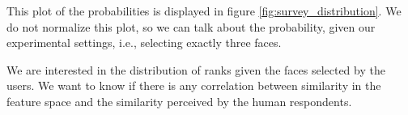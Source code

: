 This plot of the probabilities is displayed in figure \ref{fig:survey_distribution}. We do not normalize this plot, so we can talk about the probability, given our experimental settings, i.e., selecting exactly three faces.



We are interested in the distribution of ranks given the faces selected by the users. We want to know if there is any correlation between similarity in the feature space and the similarity perceived by the human respondents. 



